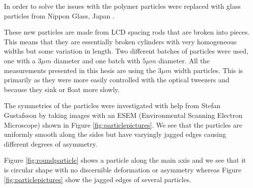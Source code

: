 In order to solve the issues with the polymer particles were replaced with glass particles from Nippon Glass, Japan \cite{Particles}. 

These new particles are made from LCD spacing rods that are broken into pieces. This means that they are essentially broken cylinders with very homogeneous widths but some variation in length. Two different batches of particles were used, one with a $3\mu m$ diameter and one batch with $5 \mu m$ diameter. All the measurements presented in this hesis are using the $3 \mu m$ width particles. This is primarily as they were more easily controlled with the optical tweezers and because they sink or float more slowly. 

The symmetries of the particles were investigated with help from Stefan Gustafsson by taking images with an 
ESEM (Environmental Scanning Electron Microscope) shown in Figure \ref{fig:particlepictures}. We see that the 
particles are uniformly smooth along the sides but have varyingly jagged edges causing different degrees of asymmetry. 

Figure \ref{fig:roundparticle} shows a particle along the main axis and we see that it is circular shape
with no discernible deformation or asymmetry whereas Figure \ref{fig:particlepictures} show the jagged edges of several particles. 


